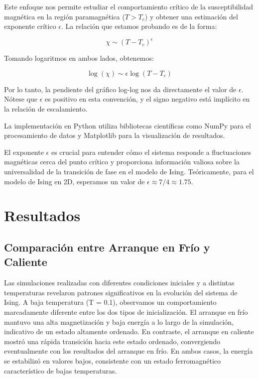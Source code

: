 \documentclass[twocolumn]{article}
\begin{document}
Este enfoque nos permite estudiar el comportamiento crítico de la susceptibilidad magnética en la región paramagnética ($T > T_c$) y obtener una estimación del exponente crítico $\epsilon$. La relación que estamos probando es de la forma:

\[ \chi \sim (T - T_c)^{\epsilon} \]

Tomando logaritmos en ambos lados, obtenemos:

\[ \log(\chi) \sim \epsilon \log(T - T_c) \]

Por lo tanto, la pendiente del gráfico log-log nos da directamente el valor de $\epsilon$. Nótese que $\epsilon$ es positivo en esta convención, y el signo negativo está implícito en la relación de escalamiento.

La implementación en Python utiliza bibliotecas científicas como NumPy para el procesamiento de datos y Matplotlib para la visualización de resultados.

El exponente $\epsilon$ es crucial para entender cómo el sistema responde a fluctuaciones magnéticas cerca del punto crítico y proporciona información valiosa sobre la universalidad de la transición de fase en el modelo de Ising. Teóricamente, para el modelo de Ising en 2D, esperamos un valor de $\epsilon \approx 7/4 \approx 1.75$.





\section{Resultados}

\subsection*{Comparación entre Arranque en Frío y Caliente}

Las simulaciones realizadas con diferentes condiciones iniciales y a distintas temperaturas revelaron patrones significativos en la evolución del sistema de Ising. A baja temperatura (T = 0.1), observamos un comportamiento marcadamente diferente entre los dos tipos de inicialización. El arranque en frío mantuvo una alta magnetización y baja energía a lo largo de la simulación, indicativo de un estado altamente ordenado. En contraste, el arranque en caliente mostró una rápida transición hacia este estado ordenado, convergiendo eventualmente con los resultados del arranque en frío. En ambos casos, la energía se estabilizó en valores bajos, consistente con un estado ferromagnético característico de bajas temperaturas.
\end{document}
